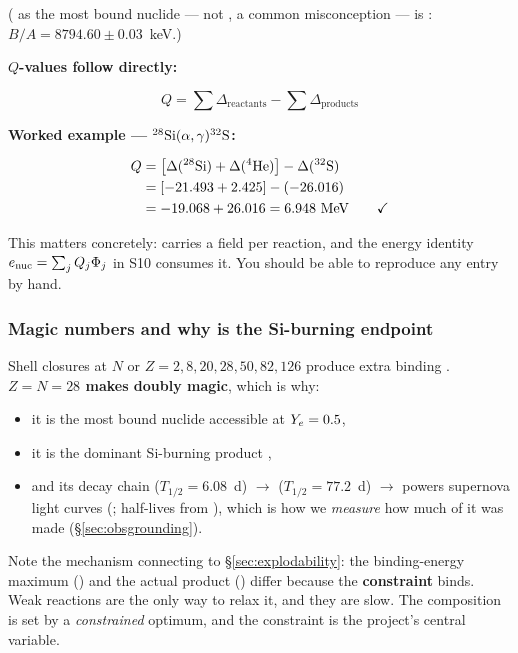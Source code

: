 ( as the most bound nuclide --- not , a common
misconception --- is \citealt{fewell1995}: $B/A = 8794.60 \pm 0.03$~keV.)

\textbf{$Q$-values follow directly:}

\begin{equation}
Q = \sum \Delta_{\text{reactants}} - \sum \Delta_{\text{products}}
\label{eq:qvalue}
\end{equation}

\textbf{Worked example --- $\nuc{Si}{28}(\alpha,\gamma)\nuc{S}{32}$:}

\begin{align*}
Q &= \bigl[\Delta(\nuc{Si}{28}) + \Delta(\nuc{He}{4})\bigr]
     - \Delta(\nuc{S}{32})\\
&= [-21.493 + 2.425] - (-26.016)\\
&= -19.068 + 26.016 = 6.948\ \mathrm{MeV} \qquad \yes
\end{align*}

This matters concretely: 
carries a  field per reaction, and the energy identity
$\enuc = \sum_j Q_j \Phi_j$ in S10 consumes it. You should be able to reproduce
any entry by hand.

\subsubsection{Magic numbers and why \texorpdfstring{}{56Ni} is the
  Si-burning endpoint}
\label{sec:magicnumbers}

Shell closures at $N$ or $Z = 2, 8, 20, 28, 50, 82, 126$ produce extra binding
\citep{otsuka2020}. \textbf{$Z = N = 28$ makes  doubly magic},
which is why:

\begin{itemize}
\item it is the most bound nuclide accessible at $\Ye = 0.5$,
\item it is the dominant Si-burning product \citep{hix1996},
\item and its decay chain  ($T_{1/2} = 6.08$~d) $\to$ 
      ($T_{1/2} = 77.2$~d) $\to$  powers supernova light curves
      (\citealt{diehl2015}; half-lives from \citeauthor{ensdf}), which is how we
      \emph{measure} how much of it was made (\S\ref{sec:obsgrounding}).
\end{itemize}

Note the mechanism connecting to \S\ref{sec:explodability}: the binding-energy
maximum () and the actual product () differ because the
\textbf{\Ye{} constraint} binds. Weak reactions are the only way to relax it,
and they are slow. The composition is set by a \emph{constrained} optimum, and
the constraint is the project's central variable.

